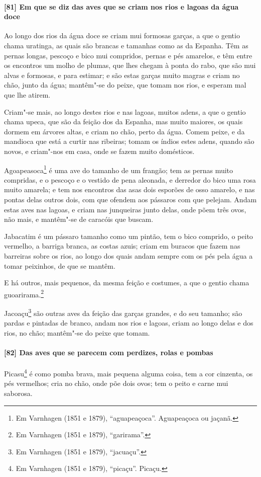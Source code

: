 \paragraph{[81] Em que se diz das aves que se criam nos rios e lagoas da água doce}\quad
Ao longo dos rios da água doce se criam mui formosas garças, a que o gentio chama
uratinga, as quais são brancas e tamanhas como as da Espanha. Têm as pernas longas,
pescoço e bico mui compridos, pernas e pés amarelos, e têm entre os encontros um molho de
plumas, que lhes chegam à ponta do rabo, que são mui alvas e formosas, e para estimar; e
são estas garças muito magras e criam no chão, junto da água; mantêm"-se do peixe, que
tomam nos rios, e esperam mal que lhe atirem.

Criam"-se mais, ao longo destes rios e nas lagoas, muitos adens, a que o gentio chama
upeca, que são da feição dos da Espanha, mas muito maiores, os quais dormem em árvores
altas, e criam no chão, perto da água. Comem peixe, e da mandioca que está a curtir nas
ribeiras; tomam os índios estes adens, quando são novos, e criam"-nos em casa, onde se
fazem muito domésticos.

Agoapeasoca\footnote{ Em Varnhagen (1851 e 1879), ``aguapeaçoca''. Aguapeaçoca ou jaçanã.}
é uma ave do tamanho de um frangão; tem as pernas muito compridas, e o pescoço e o vestido
de pena aleonada, e derredor do bico uma rosa muito amarela; e tem nos encontros das asas
dois esporões de osso amarelo, e nas pontas delas outros dois, com que ofendem aos
pássaros com que pelejam. Andam estas aves nas lagoas, e criam nas junqueiras junto delas,
onde põem três ovos, não mais, e mantêm"-se de caracóis que buscam.

Jabacatim é um pássaro tamanho como um pintão, tem o bico comprido, o peito vermelho, a
barriga branca, as costas azuis; criam em buracos que fazem nas barreiras sobre os rios,
ao longo dos quais andam sempre com os pés pela água a tomar peixinhos, de que se mantêm.

E há outros, mais pequenos, da mesma feição e costumes, a que o gentio chama
guoarirama.\footnote{ Em Varnhagen (1851 e 1879), ``garirama''.}

Jacoaçu\footnote{ Em Varnhagen (1851 e 1879), ``jacuaçu''.} são outras aves da feição das
garças grandes, e do seu tamanho; são pardas e pintadas de branco, andam nos rios e
lagoas, criam ao longo delas e dos rios, no chão; mantêm"-se do peixe que tomam.

\paragraph{[82] Das aves que se parecem com perdizes, rolas e pombas}\quad
Picasu\footnote{ Em Varnhagen (1851 e 1879), ``picaçu''. Picaçu.} é como pomba brava, mais
pequena alguma coisa, tem a cor cinzenta, os pés vermelhos; cria no chão, onde põe dois
ovos; tem o peito e carne mui saborosa.

